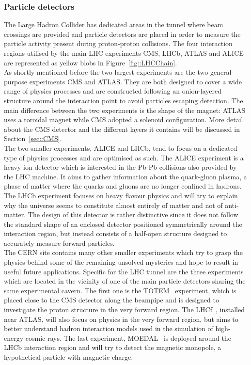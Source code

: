 \subsubsection{Particle detectors}
The Large Hadron Collider has dedicated areas in the tunnel where beam crossings are provided and particle detectors are placed in order to measure the particle activity present during proton-proton collisions. The four interaction regions utilised by the main LHC experiments CMS, LHCb, ATLAS and ALICE are represented as yellow blobs in Figure~\ref{fig::LHCChain}. 
\\
As shortly mentioned before the two largest experiments are the two general-purpose experiments CMS and ATLAS. They are both designed to cover a wide range of physics processes and are constructed following an onion-layered structure around the interaction point to avoid particles escaping detection. The main difference between the two experiments is the shape of the magnet: ATLAS uses a toroidal magnet while CMS adopted a solenoid configuration. 
More detail about the CMS detector and the different layers it contains will be discussed in Section~\ref{sec::CMS}.
\\
The two smaller experiments, ALICE and LHCb, tend to focus on a dedicated type of physics processes and are optimised as such. The ALICE experiment is a heavy-ion detector which is interested in the Pb-Pb collisions also provided by the LHC machine. It aims to gather information about the quark-gluon plasma, a phase of matter where the quarks and gluons are no longer confined in hadrons. The LHCb experiment focuses on heavy flavour physics and will try to explain why the universe seems to constitute almost entirely of matter and not of anti-matter. The design of this detector is rather distinctive since it does not follow the standard shape of an enclosed detector positioned symmetrically around the interaction region, but instead consists of a half-open structure designed to accurately measure forward particles.
\\
The CERN site contains many other smaller experiments which try to grasp the physics behind some of the remaining unsolved mysteries and hope to result in useful future applications. 
Specific for the LHC tunnel are the three experiments which are located in the vicinity of one of the main particle detectors sharing the same experimental cavern.
The first one is the TOTEM~\cite{TotemDetectorPaper} experiment, which is placed close to the CMS detector along the beampipe and is designed to investigate the proton structure %
in the very forward region. The LHCf~\cite{LHCfDetectorPaper}, installed near ATLAS, will also focus on physics in the very forward region, but aims to better understand hadron interaction models used in the simulation of high-energy cosmic rays.
The last experiment, MOEDAL~\cite{MoedalDetectorPaper} is deployed around the LHCb interaction region and will try to detect the magnetic monopole, a hypothetical particle with magnetic charge.

